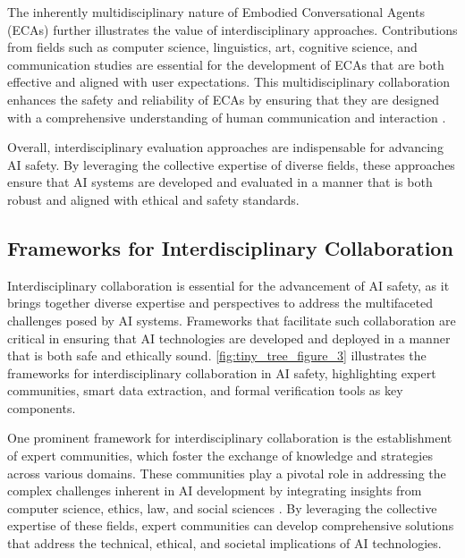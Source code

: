 The inherently multidisciplinary nature of Embodied Conversational Agents (ECAs) further illustrates the value of interdisciplinary approaches. Contributions from fields such as computer science, linguistics, art, cognitive science, and communication studies are essential for the development of ECAs that are both effective and aligned with user expectations. This multidisciplinary collaboration enhances the safety and reliability of ECAs by ensuring that they are designed with a comprehensive understanding of human communication and interaction \cite{korre2023takesvillagemultidisciplinaritycollaboration}. 



Overall, interdisciplinary evaluation approaches are indispensable for advancing AI safety. By leveraging the collective expertise of diverse fields, these approaches ensure that AI systems are developed and evaluated in a manner that is both robust and aligned with ethical and safety standards.




\subsection{Frameworks for Interdisciplinary Collaboration} \label{subsec:Frameworks for Interdisciplinary Collaboration}

Interdisciplinary collaboration is essential for the advancement of AI safety, as it brings together diverse expertise and perspectives to address the multifaceted challenges posed by AI systems. Frameworks that facilitate such collaboration are critical in ensuring that AI technologies are developed and deployed in a manner that is both safe and ethically sound. \autoref{fig:tiny_tree_figure_3} illustrates the frameworks for interdisciplinary collaboration in AI safety, highlighting expert communities, smart data extraction, and formal verification tools as key components.

One prominent framework for interdisciplinary collaboration is the establishment of expert communities, which foster the exchange of knowledge and strategies across various domains. These communities play a pivotal role in addressing the complex challenges inherent in AI development by integrating insights from computer science, ethics, law, and social sciences \cite{korre2023takesvillagemultidisciplinaritycollaboration}. By leveraging the collective expertise of these fields, expert communities can develop comprehensive solutions that address the technical, ethical, and societal implications of AI technologies.

